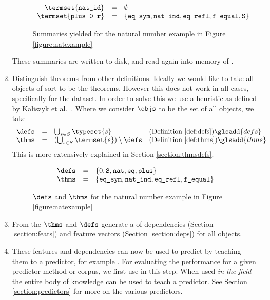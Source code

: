 \begin{enumerate}
\begin{figure}[H]
\[\begin{array}{rcl}
					\termset{\texttt{nat\_id}} & = & \emptyset \\
					\termset{\texttt{plus\_0\_r}} & = & \{ \texttt{eq\_sym}, \texttt{nat\_ind}, \texttt{eq\_refl}, \texttt{f\_equal}, \texttt{S} \}
				\end{array}
			\]
			\caption{Summaries yielded for the natural number example in Figure \ref{figure:natexample}}
		\end{figure}
		These summaries are written to disk, and read again into memory of \roerei.
	\item Distinguish theorems from other definitions.
		Ideally we would like to take all objects of sort \sortprop to be the theorems.
		However this does not work in all cases, specifically for the \corn dataset.
		In order to solve this we use a heuristic as defined by Kaliszyk et al.\ \cite{kaliszyk2014machine}.
		Where we consider $\objs$ to be the set of all \coq objects, we take
    \[
      \begin{array}{rcll}
        \defs & = & \bigcup_{s \in S} \typeset{s} & \text{(Definition \ref{def:defs})}\glsadd{defs} \\
        \thms & = & (\bigcup_{s \in S} \termset{s}) \setminus \defs & \text{(Definition \ref{def:thms})}\glsadd{thms}
      \end{array}
    \]
		This is more extensively explained in Section \ref{section:thmsdefs}.
		\begin{figure}[H]
			\[
				\begin{array}{rcl}
					\defs & = & \{ 0, \texttt{S}, \texttt{nat}, \texttt{eq}, \texttt{plus} \} \\
					\thms & = & \{ \texttt{eq\_sym}, \texttt{nat\_ind}, \texttt{eq\_refl}, \texttt{f\_equal} \}
				\end{array}
			\]
			\caption{$\defs$ and $\thms$ for the natural number example in Figure \ref{figure:natexample}}
		\end{figure}
    \item From the $\thms$ and $\defs$ generate a \dagraph of dependencies (Section \ref{section:feats})
			and feature vectors (Section \ref{section:deps}) for all \coq objects.
	\item These features and dependencies can now be used to predict by teaching them to a predictor, for example \knn.
		For evaluating the performance for a given predictor method or corpus, we first use \crossvalidation in this step.
		When used \emph{in the field} the entire body of knowledge can be used to teach a predictor.
		See Section \ref{section:predictors} for more on the various predictors.
\end{enumerate}


